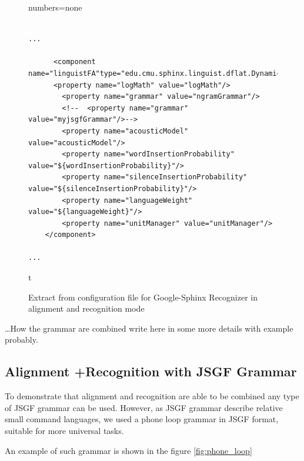 \begin{figure}[htbp]
  \centering 
 
{numbers=none}  
\lstset{language=XML} 
\begin{lstlisting}[style=nonumbers]

...

      <component name="linguistFA"type="edu.cmu.sphinx.linguist.dflat.DynamicFlatLinguist"> 
      <property name="logMath" value="logMath"/>
        <property name="grammar" value="ngramGrammar"/> 
        <!--  <property name="grammar" value="myjsgfGrammar"/>--> 
        <property name="acousticModel" value="acousticModel"/>
        <property name="wordInsertionProbability" value="${wordInsertionProbability}"/>
        <property name="silenceInsertionProbability" value="${silenceInsertionProbability}"/>
        <property name="languageWeight" value="${languageWeight}"/>
        <property name="unitManager" value="unitManager"/>
    </component>

...
\end{lstlisting}t 
 \caption{Extract from configuration file for Google-Sphinx Recognizer in
 alignment and recognition mode}
  \label{fig:conf_al_rec}
\end {figure}


\ldots How the grammar are combined write here in some more details with example
probably. 

\subsection {Alignment +Recognition with JSGF Grammar}
To demonstrate that alignment and recognition are able to be combined any
type of JSGF grammar can be used. However, as JSGF grammar describe 
relative small command languages, we used a phone loop grammar in JSGF format,
suitable for more universal tasks.

An example of such grammar is shown in the figure   \ref{fig:phone_loop}

